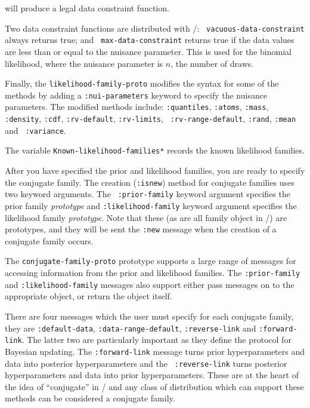 \noindent will produce a legal data constraint function.  

Two data constraint functions are distributed with \eltoy/:  {\tt
vacuous-data-constraint\/} always returns true; and {\tt
max-data-constraint\/} returns true if the data values are less than
or equal to the nuisance parameter.  This is used for the binomial
likelihood, where the nuisance parameter is $n$, the number of draws.

\smallskip

Finally, the {\tt likelihood-family-proto\/} modifies the syntax for
some of the methods by adding a {\tt :nui-parameters\/} keyword to
specify the nuisance parameters.  The modified methods include:
{\tt :quantiles\/}, {\tt :atoms\/}, {\tt :mass\/}, {\tt :density\/},
{\tt :cdf\/}, {\tt :rv-default\/},  {\tt :rv-limits\/}, {\tt
:rv-range-default\/}, {\tt :rand\/}, {\tt :mean\/} and {\tt
:variance\/}.  

The variable {\tt *Known-likelihood-families*\/} records the known
likelihood families.

\bigskip

After you have specified the prior and likelihood families, you are
ready to specify the conjugate family.  The creation ({\tt :isnew})
method for conjugate families uses two keyword arguments. The {\tt
:prior-family\/} keyword argument specifies the prior family {\it
prototype\/} and {\tt :likelihood-family\/} keyword argument specifies
the likelihood family {\it prototype\/}.  Note that these (as are all
family object in \eltoy/) are prototypes, and they will be sent the
{\tt :new\/} message when the creation of a conjugate family occurs.

The {\tt conjugate-family-proto\/} prototype supports a large range of
messages for accessing information from the prior and likelihood
families.  The {\tt :prior-family\/} and {\tt :likelihood-family\/}
messages also support either pass messages on to the appropriate
object, or return the object itself.

There are four messages which the user must specify for each conjugate
family, they are {\tt :default-data\/}, {\tt :data-range-default\/},
{\tt :reverse-link\/} and {\tt :forward-link\/}.  The latter two are
particularly important as they define the protocol for Bayesian
updating.  The {\tt :forward-link\/} message turns prior
hyperparameters and data into posterior hyperparameters and the {\tt
:reverse-link\/} turns posterior hyperparameters and data into prior
hyperparameters.  These are at the heart of the idea of ``conjugate''
in \eltoy/ and any class of distribution which can support these
methods can be considered a conjugate family.

